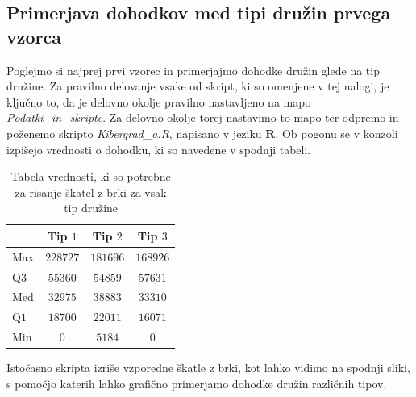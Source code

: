 \documentclass[a4paper, 10pt]{article}
\begin{document}
	\subsection{Primerjava dohodkov med tipi družin prvega vzorca} \label{subsect: 1A}
	Poglejmo si najprej prvi vzorec in primerjajmo dohodke družin glede na tip družine. Za pravilno delovanje vsake od skript, ki so omenjene v tej nalogi, je ključno to, da je delovno okolje pravilno nastavljeno na mapo \textit{Podatki\_in\_skripte}. Za delovno okolje torej nastavimo to mapo ter odpremo in poženemo skripto \textit{Kibergrad\_a.R}, napisano v jeziku $\textbf{R}$. Ob pogonu se v konzoli izpišejo vrednosti o dohodku, ki so navedene v spodnji tabeli.
	\begin{table}[h!]
		\label{tab: quartA}
		\centering
		\begin{tabular}{|l|c|c|c|}
			\hline
			& Tip $1$ & Tip $2$ & Tip $3$ \\ \hline
			Max & $228727$ & $181696$ & $168926$ \\ \hline
			Q$3$ & $55360$ & $54859$ & $57631$ \\ \hline
			Med & $32975$ & $38883$ & $33310$ \\ \hline
			Q$1$ & $18700$ & $22011$ & $16071$ \\ \hline
			Min & $0$ & $5184$ & $0$ \\ \hline
		\end{tabular}
	\caption{Tabela vrednosti, ki so potrebne za risanje škatel z brki za vsak tip družine}
	\end{table}

	Istočasno skripta izriše vzporedne škatle z brki, kot lahko vidimo na spodnji sliki, s pomočjo katerih lahko grafično primerjamo dohodke družin različnih tipov.
	
\end{document}
